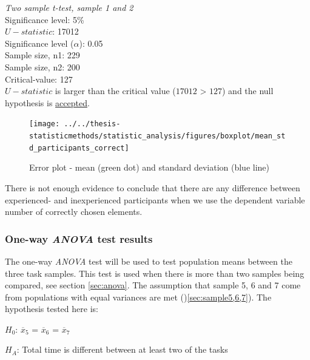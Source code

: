  \begin{center}
	\begin{tcolorbox}[box align=center,width=\textwidth-5cm]
		\centering
		\textit{Two sample t-test, sample 1 and 2}\\
		Significance level: 5\%  \\[0.5cm]
		
		$U-statistic$: 17012 \\
		Significance level ($\alpha$): 0.05 \\
		Sample size, n1:  229\\
		Sample size, n2: 200\\
		Critical-value: 127 \\[0.2cm] %
		
		$U-statistic$ is larger than the critical value ($17012$ > $127$) and the null hypothesis is \underline{accepted}.\\[0.5cm]
	\end{tcolorbox} 
\end{center}

\begin{figure}[H]
	\centering
	\texttt{[image: ../../thesis-statisticmethods/statistic\_analysis/figures/boxplot/mean\_std\_participants\_correct]}
	\caption{Error plot - mean (green dot) and standard deviation (blue line)}
	\label{fig:meanstdparticipantscorrect}
\end{figure}

There is not enough evidence to conclude that there are any difference between experienced- and inexperienced participants when we use the dependent variable number of correctly chosen elements. 

\subsubsection{One-way \textit{ANOVA} test results}\label{sec:anova_result}

The one-way \textit{ANOVA} test will be used to test population means between the three task samples. This test is used when there is more than two samples being compared, see section \ref{sec:anova}. The assumption that sample 5, 6 and 7 come from populations with equal variances are met ()\ref{sec:sample5,6,7}). The hypothesis tested here is: \\

\centerline{$H_{0}$: $\overline{x}_5$ = $\overline{x}_6$ = $\overline{x}_7$}
\centerline{$H_{A}$: Total time is different between at least two of the tasks}

